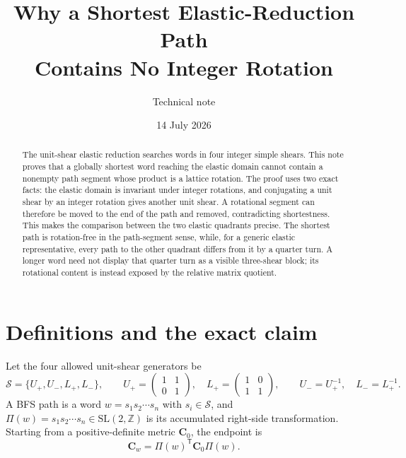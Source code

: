 \documentclass[11pt]{article}
\title{Why a Shortest Elastic-Reduction Path\\
Contains No Integer Rotation}
\author{Technical note}
\date{14 July 2026}
\newcommand{\trans}{\mathsf{T}}
\newcommand{\Sset}{\mathcal S}
\newcommand{\SLZ}{\mathrm{SL}(2,\mathbb Z)}
\newcommand{\wordprod}{\Pi}
\newcommand{\Uplus}{U_{+}}
\newcommand{\Uminus}{U_{-}}
\newcommand{\Lplus}{L_{+}}
\newcommand{\Lminus}{L_{-}}
\theoremstyle{definition}
\begin{document}
\maketitle

\begin{abstract}
The unit-shear elastic reduction searches words in four integer simple
shears.  This note proves that a globally shortest word reaching the elastic
domain cannot contain a nonempty path segment whose product is a lattice
rotation.  The proof uses two exact facts: the elastic domain is invariant
under integer rotations, and conjugating a unit shear by an integer rotation
gives another unit shear.  A rotational segment can therefore be moved to
the end of the path and removed, contradicting shortestness.  This makes the
comparison between the two elastic quadrants precise.  The shortest path is
rotation-free in the path-segment sense, while, for a generic elastic
representative, every path to the other quadrant differs from it by a
quarter turn.  A longer word need not display that quarter turn as a visible
three-shear block; its rotational content is instead exposed by the relative
matrix quotient.
\end{abstract}

\section{Definitions and the exact claim}

Let the four allowed unit-shear generators be
\begin{equation}
 \Sset=\{\Uplus,\Uminus,\Lplus,\Lminus\},
 \qquad
 \Uplus=\begin{pmatrix}1&1\\0&1\end{pmatrix},\quad
 \Lplus=\begin{pmatrix}1&0\\1&1\end{pmatrix},
 \qquad
 \Uminus=\Uplus^{-1},\quad \Lminus=\Lplus^{-1}.
 \label{eq:generators}
\end{equation}
A BFS path is a word \(w=s_1s_2\cdots s_n\) with \(s_i\in\Sset\), and
\(\wordprod(w)=s_1s_2\cdots s_n\in\SLZ\) is its accumulated right-side
transformation.  Starting from a positive-definite metric \(\mathbf C_0\),
the endpoint is
\begin{equation}
 \mathbf C_w=\wordprod(w)^\trans\mathbf C_0\wordprod(w).
 \label{eq:pathaction}
\end{equation}
\end{document}
